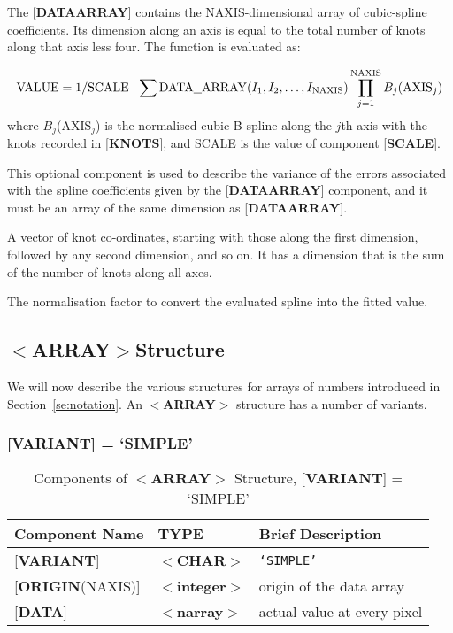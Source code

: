 \documentclass[twoside,11pt]{article}
\newcommand{\htmlref}[2]{#1}
\newcommand{\html}[1]{}
\newcommand{\latex}[1]{#1}
\newcommand{\xlabel}[1]{}
\renewcommand{\_}{\texttt{\symbol{95}}}
\begin{document}
\begin{description}

\item The {[}{\bf DATA\_ARRAY}{]} contains the NAXIS-dimensional array of
cubic-spline coefficients.  Its dimension along an axis is equal to
the total number of knots along that axis less four.  The function
is evaluated as:

\[{\rm VALUE}=1/{\rm SCALE}~~\sum {\rm DATA\underline{~~}ARRAY}(I_1,I_2,\ldots,I_{\rm NAXIS})\prod_{j=1}^{\rm NAXIS} B_j({\rm AXIS}_j) \]
where $B_j$(AXIS$_j$) is the normalised cubic B-spline along the $j$th
axis with the knots recorded in {[}{\bf KNOTS}{]}, and SCALE is the value
of component {[}{\bf SCALE}{]}.

\item [{[}VARIANCE{]}]  This optional component is used to describe the
variance of the errors associated with the spline coefficients
given by the {[}{\bf DATA\_ARRAY}{]} component, and it must be an
array of the same dimension as {[}{\bf DATA\_ARRAY}{]}.

\item [{[}KNOTS{]}]  A vector of knot co-ordinates, starting with
those along the first dimension, followed by any second dimension, and
so on.  It has a dimension that is the sum of the number of knots
along all axes.

\item [{[}SCALE{]}] The normalisation factor to convert the evaluated
spline into the fitted value.

\end{description}

\subsection{\xlabel{se_array}$<${\bf ARRAY}$>$Structure\label{se:sarray}}

We will now describe the various structures for arrays of numbers
introduced in \latex{Section~\ref{se:notation}.}\html{\htmlref{Notation
and Pseudo-types.}{se:notation}}
An \mbox{$<${\bf ARRAY}$>$} structure has a number of variants.

\subsubsection{{[}{\bf VARIANT}{]} = `SIMPLE'}

\begin{table}[htb]
\centering
\caption{Components of $<${\bf ARRAY}$>$ Structure,
               {[}{\bf VARIANT}{]} = `SIMPLE'}
\begin{tabular}{|l|l|l|}
\hline
Component Name  & TYPE & Brief Description \\ \hline
{[}{\bf VARIANT}{]} & $<${\bf \_CHAR}$>$ & {\tt `SIMPLE'} \\
{[}{\bf ORIGIN}(NAXIS){]} & $<${\bf integer}$>$ & origin of the data array \\
{[}{\bf DATA}{]} & $<${\bf narray}$>$ & actual value at every pixel \\ \hline
\end{tabular}
\end{table}
\end{document}

